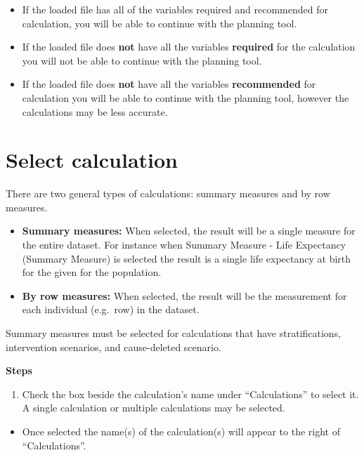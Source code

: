 \documentclass[]{book}
\providecommand{\tightlist}{%
  \setlength{\itemsep}{0pt}\setlength{\parskip}{0pt}}
\begin{document}
\begin{itemize}
\item
  If the loaded file has all of the variables required and recommended
  for calculation, you will be able to continue with the planning tool.
\item
  If the loaded file does \textbf{not} have all the variables
  \textbf{required} for the calculation you will not be able to continue
  with the planning tool.
\item
  If the loaded file does \textbf{not} have all the variables
  \textbf{recommended} for calculation you will be able to continue with
  the planning tool, however the calculations may be less accurate.
\end{itemize}

\section{Select calculation}\label{select-calculation}

There are two general types of calculations: summary measures and by row
measures.

\begin{itemize}
\item
  \textbf{Summary measures:} When selected, the result will be a single measure for
the entire dataset. For instance when Summary Measure - Life Expectancy
(Summary Measure) is selected the result is a single life expectancy at
birth for the given for the population.
\item
  \textbf{By row measures:} When selected, the result will be the measurement for
each individual (e.g.~row) in the dataset.
\end{itemize}

Summary measures must be selected for calculations that have
stratifications, intervention scenarios, and cause-deleted scenario.

\textbf{Steps}

\begin{enumerate}
\def\labelenumi{\arabic{enumi}.}
\tightlist
\item
  Check the box beside the calculation's name under ``Calculations'' to
  select it. A single calculation or multiple calculations may be
  selected.
\end{enumerate}

\begin{itemize}
\tightlist
\item
  Once selected the name(s) of the calculation(s) will appear to the
  right of ``Calculations''.
\end{itemize}
\end{document}
